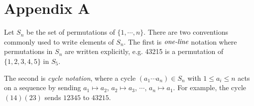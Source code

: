 \documentclass[11pt,letterpaper,twoside,english]{article}
\theoremstyle{theorem}
\theoremstyle{remark}
\begin{document}
\section{Appendix A}

Let $S_n$ be the set of permutations of $\{1,\cdots, n\}$. There are two conventions commonly used to write elements of $S_n$. The first is $\emph{one-line}$ notation where permutations in $S_n$ are written explicitly, e.g. 43215 is a permutation of $\{1,2,3,4,5\}$ in $S_5$. 

The second is \emph{cycle notation}, where a cycle $(a_1\cdots a_n)\in S_n$ with $1\le a_i\le n$ acts on a sequence by sending $a_1\mapsto a_2$, $a_2\mapsto a_3$, $\cdots$, $a_n\mapsto a_1$. For example, the cycle $(14)(23)$ sends $12345$ to $43215$. 
\end{document}
